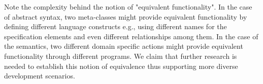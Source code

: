 Note the complexity behind the notion of "equivalent functionality". In the case of abstract syntax, two meta-classes might provide equivalent functionality by defining different language constructs e.g., using different names for the specification elements and even different relationships among them. In the case of the semantics, two different domain specific actions might provide equivalent functionality through different programs. We claim that further research is needed to establish this notion of equivalence thus supporting more diverse development scenarios. 




